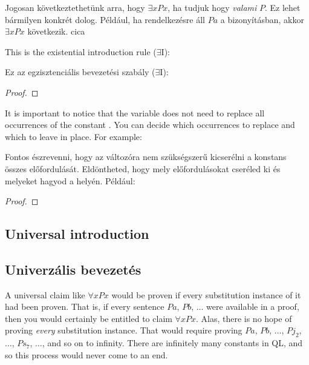 Jogosan következtethetünk arra, hogy $\exists x Px$, ha tudjuk hogy \emph{valami} $P$. Ez lehet bármilyen konkrét dolog. Például, ha rendelkezésre áll $Pa$ a bizonyításban, akkor $ \exists x Px$ következik.
cica



This is the existential introduction rule ($\exists$I):

Ez az egzisztenciális bevezetési szabály ($\exists$I):

\begin{proof}
	 
\end{proof}

It is important to notice that the variable  does not need to replace all occurrences of the constant . You can decide which occurrences to replace and which to leave in place.
For example:

Fontos észrevenni, hogy az  változóra nem szükségszerű kicserélni a  konstans összes előfordulását. Eldöntheted, hogy mely előfordulásokat cseréled ki és melyeket hagyod a helyén.
Például: 
\nopagebreak
\begin{proof}
	 
	 
	 
	 
	 
\end{proof}

\subsection{Universal introduction}
\subsection*{Univerzális bevezetés}
A universal claim like $\forall x Px$ would be proven if {every} substitution instance of it had been proven. That is, if every sentence $Pa$, $Pb$, $\ldots$ were available in a proof, then you would certainly be entitled to claim $\forall x Px$. Alas, there is no hope of proving \emph{every} substitution instance. That would require proving $Pa$, $Pb$, $\ldots$, $Pj_2$, $\ldots$, $Ps_7$, $\ldots$, and so on to infinity. There are infinitely many constants in QL, and so this process would never come to an end.

